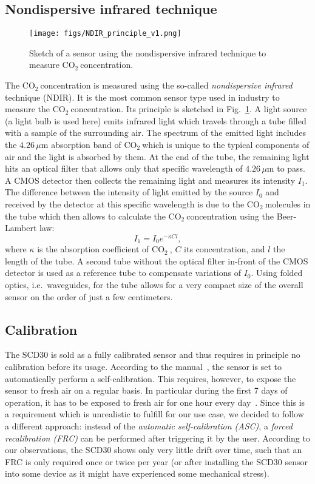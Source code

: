 \documentclass[12pt,a4paper]{article}
\newcommand{\coo}{\ensuremath{\mathrm{CO_2}~}}
\begin{document}
\subsection{Nondispersive infrared technique}
\begin{figure}[ht]
\center
\texttt{[image: figs/NDIR\_principle\_v1.png]}
\caption{Sketch of a sensor using the nondispersive infrared technique to measure \coo concentration.}
\label{f:NDIR_sketch}
\end{figure}
The \coo concentration is measured using the so-called \textit{nondispersive infrared} technique (NDIR). It is the most common sensor type used in industry to measure the \coo concentration. Its principle is sketched in Fig.~\ref{f:NDIR_sketch}. A light source (a light bulb is used here) emits infrared light which travels through a tube filled with a sample of the surrounding air. The spectrum of the emitted light includes the $4.26\,\mu\mathrm{m}$ absorption band of \coo which is unique to the typical components of air and the light is absorbed by them. At the end of the tube, the remaining light hits an optical filter that allows only that specific wavelength of $4.26\,\mu\mathrm{m}$ to pass. A CMOS detector then collects the remaining light and measures its intensity $I_1$. The difference between the intensity of light emitted by the source $I_0$ and received by the detector at this specific wavelength is due to the \coo molecules in the tube which then allows to calculate the \coo concentration using the Beer-Lambert law:
\begin{equation}
I_1 = I_0 e^{-\kappa C l},
\end{equation}
where $\kappa$ is the absorption coefficient of \coo, $C$ its concentration, and $l$ the length of the tube. A second tube without the optical filter in-front of the CMOS detector is used as a reference tube to compensate variations of $I_0$. Using folded optics, i.e.\ waveguides, for the tube allows for a very compact size of the overall sensor on the order of just a few centimeters.

\subsection{Calibration}\label{s:SCD30calibration}
The SCD30 is sold as a fully calibrated sensor and thus requires in principle no calibration before its usage. According to the manual~\cite{SENSIRION2020C}, the sensor is set to automatically perform a self-calibration. This requires, however, to expose the sensor to fresh air on a regular basis. In particular during the first 7 days of operation, it has to be exposed to fresh air for one hour every day~\cite{SENSIRION2020C}. Since this is a requirement which is unrealistic to fulfill for our use case, we decided to follow a different approach: instead of the \textit{automatic self-calibration (ASC)}, a \textit{forced recalibration (FRC)} can be performed after triggering it by the user. According to our observations, the SCD30 shows only very little drift over time, such that an FRC is only required once or twice per year (or after installing the SCD30 sensor into some device as it might have experienced some mechanical stress). 
\end{document}
